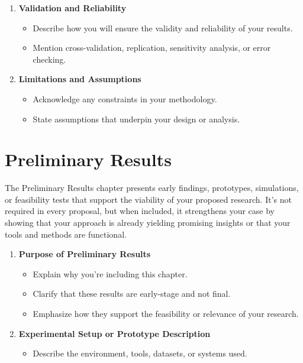 \documentclass[PCOM,Proposal,Review]{mpThesis}
\newcommand{\Hd}[1]{{\color{SteelBlue}\bf#1}}
\begin{document}
\begin{MainMatter}
\begin{Remark}
\begin{enumerate}
\item \Hd{Validation and Reliability}
  \begin{itemize}
  \item Describe how you will ensure the validity and reliability of your results.

  \item Mention cross-validation, replication, sensitivity analysis, or error checking.
  \end{itemize}

\item \Hd{Limitations and Assumptions}
  \begin{itemize}
  \item Acknowledge any constraints in your methodology.

  \item State assumptions that underpin your design or analysis.
  \end{itemize}
\end{enumerate}
\end{Remark}

\chapter{Preliminary Results}
\label{ch:pre-result}
\minitoc

\begin{Remark}
The Preliminary Results chapter presents early findings, prototypes, simulations, or feasibility tests
that support the viability of your proposed research.
It's not required in every proposal, but when included, it strengthens your case by showing that
your approach is already yielding promising insights or that your tools and methods are functional.
\begin{enumerate}
\item \Hd{Purpose of Preliminary Results}
  \begin{itemize}
  \item Explain why you’re including this chapter.

  \item Clarify that these results are early-stage and not final.

  \item Emphasize how they support the feasibility or relevance of your research.
  \end{itemize}

\item \Hd{Experimental Setup or Prototype Description}
  \begin{itemize}
  \item Describe the environment, tools, datasets, or systems used.


\end{itemize}
\end{enumerate}
\end{Remark}
\end{MainMatter}
\end{document}
